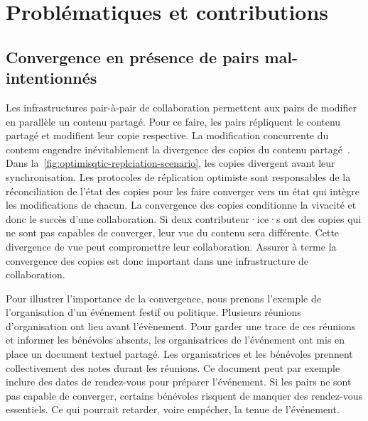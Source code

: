\section{Problématiques et contributions}\label{sec:problematic}


\subsection{Convergence en présence de pairs mal-intentionnés}

Les infrastructures pair-à-pair de collaboration permettent aux pairs de modifier en parallèle un contenu partagé.
Pour ce faire, les pairs répliquent le contenu partagé et modifient leur copie respective.
La modification concurrente du contenu engendre inévitablement la divergence des copies du contenu partagé~\autocite{dourish_1995_divergence}.
Dans la~\autoref{fig:optimisqtic-replciation-scenario}, les copies divergent avant leur synchronisation.
Les protocoles de réplication optimiste sont responsables de la réconciliation de l'état des copies pour les faire converger vers un état qui intègre les modifications de chacun.
La convergence des copies conditionne la vivacité et donc le succès d'une collaboration.
Si deux contributeur·ice·s ont des copies qui ne sont pas capables de converger, leur vue du contenu sera différente.
Cette divergence de vue peut compromettre leur collaboration.
Assurer à terme la convergence des copies est donc important dans une infrastructure de collaboration.

Pour illustrer l'importance de la convergence, nous prenons l'exemple de l'organisation d'un événement festif ou politique.
Plusieurs réunions d'organisation ont lieu avant l'évènement.
Pour garder une trace de ces réunions et informer les bénévoles absents, les organisatrices de l'événement ont mis en place un document textuel partagé.
Les organisatrices et les bénévoles prennent collectivement des notes durant les réunions.
Ce document peut par exemple inclure des dates de rendez-vous pour préparer l'événement.
Si les pairs ne sont pas capable de converger, certains bénévoles risquent de manquer des rendez-vous essentiels.
Ce qui pourrait retarder, voire empécher, la tenue de l'événement.

